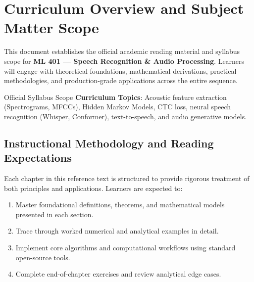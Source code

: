 \section{Curriculum Overview and Subject Matter Scope}

This document establishes the official academic reading material and syllabus scope for \textbf{ML 401 --- Speech Recognition \& Audio Processing}. Learners will engage with theoretical foundations, mathematical derivations, practical methodologies, and production-grade applications across the entire sequence.

\begin{InsightBox}{Official Syllabus Scope}
  \textbf{Curriculum Topics}: Acoustic feature extraction (Spectrograms, MFCCs), Hidden Markov Models, CTC loss, neural speech recognition (Whisper, Conformer), text-to-speech, and audio generative models.
\end{InsightBox}

\subsection{Instructional Methodology and Reading Expectations}

Each chapter in this reference text is structured to provide rigorous treatment of both principles and applications. Learners are expected to:
\begin{enumerate}
  \item Master foundational definitions, theorems, and mathematical models presented in each section.
  \item Trace through worked numerical and analytical examples in detail.
  \item Implement core algorithms and computational workflows using standard open-source tools.
  \item Complete end-of-chapter exercises and review analytical edge cases.
\end{enumerate}

